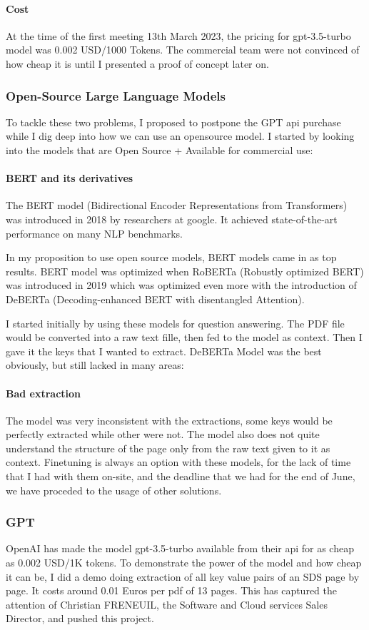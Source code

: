 \documentclass[a4paper,12pt,twoside]{report}
\begin{document}
\paragraph{Cost}
At the time of the first meeting 13th March 2023, the pricing for gpt-3.5-turbo model was 0.002 USD/1000 Tokens. The commercial team were not convinced of how cheap it is until I presented a proof of concept later on.
\subsubsection{Open-Source Large Language Models}
To tackle these two problems, I proposed to postpone the GPT api purchase while I dig deep into how we can use an opensource model. I started by looking into the models that are Open Source + Available for commercial use:
\paragraph{BERT and its derivatives}
The BERT model \cite{devlin2019bert} (Bidirectional Encoder Representations from Transformers) was introduced in 2018 by researchers at google. It achieved state-of-the-art performance on many NLP benchmarks. 

In my proposition to use open source models, BERT models came in as top results. BERT model was optimized when RoBERTa\cite{liu2019roberta} (Robustly optimized BERT) was introduced in 2019 which was optimized even more with the introduction of DeBERTa \cite{he2021deberta} (Decoding-enhanced BERT with disentangled Attention).

I started initially by using these models for question answering. The PDF file would be converted into a raw text fille, then fed to the model as context. Then I gave it the keys that I wanted to extract. DeBERTa Model was the best obviously, but still lacked in many areas:
\paragraph{Bad extraction}
The model was very inconsistent with the extractions, some keys would be perfectly extracted while other were not. The model also does not quite understand the structure of the page only from the raw text given to it as context.
Finetuning is always an option with these models, for the lack of time that I had with them on-site, and the deadline that we had for the end of June, we have proceded to the usage of other solutions.
\subsubsection{GPT}
OpenAI has made the model gpt-3.5-turbo available from their api for as cheap as 0.002 USD/1K tokens. To demonstrate the power of the model and how cheap it can be, I did a demo doing extraction of all key value pairs of an SDS page by page. It costs around 0.01 Euros per pdf of 13 pages. This has captured the attention of Christian FRENEUIL, the Software and Cloud services Sales Director, and pushed this project. 
\end{document}
